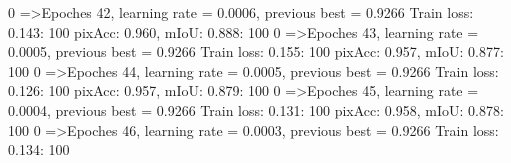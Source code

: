   0%
=>Epoches 42, learning rate = 0.0006,                 previous best = 0.9266
Train loss: 0.143: 100%
pixAcc: 0.960, mIoU: 0.888: 100%
  0%
=>Epoches 43, learning rate = 0.0005,                 previous best = 0.9266
Train loss: 0.155: 100%
pixAcc: 0.957, mIoU: 0.877: 100%
  0%
=>Epoches 44, learning rate = 0.0005,                 previous best = 0.9266
Train loss: 0.126: 100%
pixAcc: 0.957, mIoU: 0.879: 100%
  0%
=>Epoches 45, learning rate = 0.0004,                 previous best = 0.9266
Train loss: 0.131: 100%
pixAcc: 0.958, mIoU: 0.878: 100%
  0%
=>Epoches 46, learning rate = 0.0003,                 previous best = 0.9266
Train loss: 0.134: 100%
